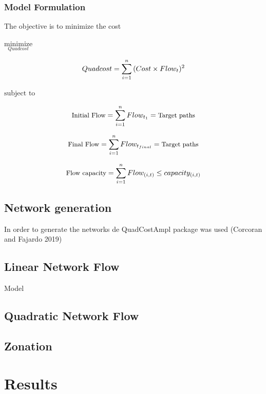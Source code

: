 \documentclass[]{article}
\begin{document}
\hypertarget{model-formulation}{%
\subsubsection{Model Formulation}\label{model-formulation}}

The objective is to minimize the cost

\(\underset{Quadcost}{\text{minimize}}\)

\[\small Quadcost =  \sum_{i=1}^n{(Cost\times Flow_t)^2}\]

\(\text{subject to}\)

\[\small \text{Initial Flow} = \sum_{i=1}^n{Flow_{t_1}} = \text{Target paths}\]

\[\small \text{Final Flow} = \sum_{i=1}^n{Flow_{t_{final}}} = \text{Target paths}\]

\[\small \text{Flow capacity} = \sum_{i=1}^n{Flow_{(i,t)}} \leq capacity_{(i,t)}\]

\hypertarget{network-generation}{%
\subsection{Network generation}\label{network-generation}}

In order to generate the networks de QuadCostAmpl package was used (Corcoran and Fajardo 2019)

\hypertarget{linear-network-flow}{%
\subsection{Linear Network Flow}\label{linear-network-flow}}

Model

\hypertarget{quadratic-network-flow}{%
\subsection{Quadratic Network Flow}\label{quadratic-network-flow}}

\hypertarget{zonation}{%
\subsection{Zonation}\label{zonation}}

\hypertarget{results}{%
\section*{Results}\label{results}}
\end{document}
